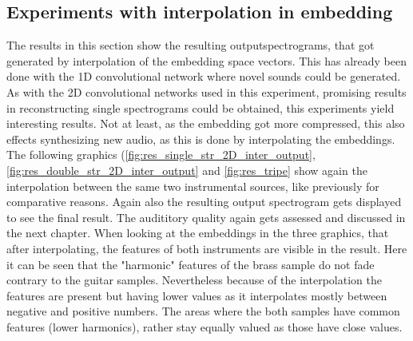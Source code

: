 \subsection{Experiments with interpolation in embedding}
The results in this section show the resulting outputspectrograms, that got generated by interpolation of the embedding space vectors. This has already been done with the 1D convolutional network where novel sounds could be generated. As with the 2D convolutional networks used in this experiment, promising results in reconstructing single spectrograms could be obtained, this experiments yield interesting results. Not at least, as the embedding got more compressed, this also effects synthesizing new audio, as this is done by interpolating the embeddings. The following graphics (\ref{fig:res_single_str_2D_inter_output}, \ref{fig:res_double_str_2D_inter_output} and \ref{fig:res_tripe} show again the interpolation between the same two instrumental sources, like previously for comparative reasons. Again also the resulting output spectrogram gets displayed to see the final result. The audititory quality again gets assessed and discussed in the next chapter.
When looking at the embeddings in the three graphics, that after interpolating, the features of both instruments are visible in the result. Here it can be seen that the "harmonic" features of the brass sample do not fade contrary to the guitar samples. Nevertheless because of the interpolation the features are present but having lower values as it interpolates mostly between negative and positive numbers. The areas where the both samples have common features (lower harmonics), rather stay equally valued as those have close values. 

